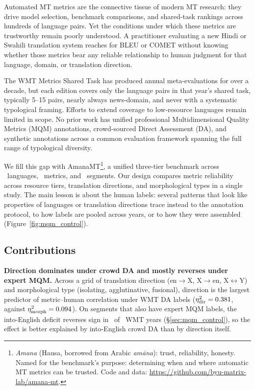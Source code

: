 \documentclass[11pt]{article}
\begin{document}
Automated MT metrics are the connective tissue of modern MT research: they drive model selection, benchmark comparisons, and shared-task rankings across hundreds of language pairs. Yet the conditions under which these metrics are trustworthy remain poorly understood. A practitioner evaluating a new Hindi or Swahili translation system reaches for BLEU or COMET without knowing whether those metrics bear any reliable relationship to human judgment for that language, domain, or translation direction.

The WMT Metrics Shared Task \cite{freitag2023results} has produced annual meta-evaluations for over a decade, but each edition covers only the language pairs in that year's shared task, typically 5--15 pairs, nearly always news-domain, and never with a systematic typological framing. Efforts to extend coverage to low-resource languages \cite{yari2025item} remain limited in scope. No prior work has unified professional Multidimensional Quality Metrics (MQM) annotations, crowd-sourced Direct Assessment (DA), and synthetic annotations across a common evaluation framework spanning the full range of typological diversity.

We fill this gap with AmanaMT\footnote{\emph{Amana} (Hausa, borrowed from Arabic \emph{am\=ana}): trust, reliability, honesty. Named for the benchmark's purpose: determining when and where automatic MT metrics can be trusted. Code and data: \url{https://github.com/byu-matrix-lab/amana-mt}.}, a unified three-tier benchmark across \NumLanguages\ languages, \NumMetrics\ metrics, and \TotalSegments\ segments. Our design compares metric reliability across resource tiers, translation directions, and morphological types in a single study. The main lesson is about the human labels: several patterns that look like properties of languages or translation directions trace instead to the annotation protocol, to how labels are pooled across years, or to how they were assembled (Figure~\ref{fig:mqm_control}).

\subsection{Contributions}

\textbf{Direction dominates under crowd DA and mostly reverses under expert MQM.} Across a grid of translation direction (en$\to$X, X$\to$en, X$\leftrightarrow$Y) and morphological type (isolating, agglutinative, fusional), direction is the largest predictor of metric--human correlation under WMT DA labels ($\eta^2_{\text{dir}}=0.381$, against $\eta^2_{\text{morph}}=0.094$). On segments that also have expert MQM labels, the into-English deficit reverses sign in \MqmCtrlNNegMQM\ of \MqmCtrlNYearsMQM\ WMT years (\S\ref{sec:mqm_control}), so the effect is better explained by into-English crowd DA than by direction itself.
\end{document}
